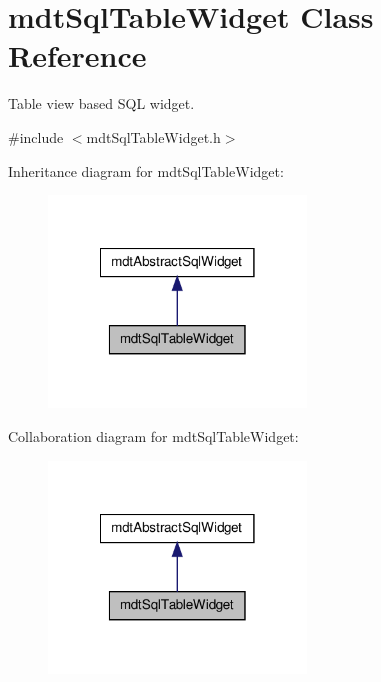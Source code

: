\hypertarget{classmdt_sql_table_widget}{
\section{mdtSqlTableWidget Class Reference}
\label{classmdt_sql_table_widget}
}


Table view based SQL widget.  




{\ttfamily \#include $<$mdtSqlTableWidget.h$>$}



Inheritance diagram for mdtSqlTableWidget:
\nopagebreak
\begin{figure}[H]
\begin{center}
\leavevmode
\includegraphics[width=194pt]{classmdt_sql_table_widget__inherit__graph}
\end{center}
\end{figure}


Collaboration diagram for mdtSqlTableWidget:
\nopagebreak
\begin{figure}[H]
\begin{center}
\leavevmode
\includegraphics[width=194pt]{classmdt_sql_table_widget__coll__graph}
\end{center}
\end{figure}
